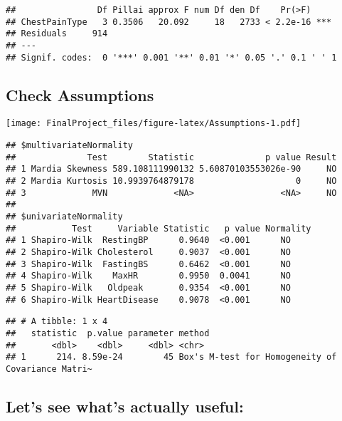 \documentclass[
]{article}
\newenvironment{Shaded}{\begin{snugshade}}{\end{snugshade}}
\newcommand{\AttributeTok}[1]{\textcolor[rgb]{0.77,0.63,0.00}{#1}}
\newcommand{\FunctionTok}[1]{\textcolor[rgb]{0.00,0.00,0.00}{#1}}
\newcommand{\NormalTok}[1]{#1}
\newcommand{\SpecialCharTok}[1]{\textcolor[rgb]{0.00,0.00,0.00}{#1}}
\begin{document}
\begin{verbatim}
##                Df Pillai approx F num Df den Df    Pr(>F)    
## ChestPainType   3 0.3506   20.092     18   2733 < 2.2e-16 ***
## Residuals     914                                            
## ---
## Signif. codes:  0 '***' 0.001 '**' 0.01 '*' 0.05 '.' 0.1 ' ' 1
\end{verbatim}

\hypertarget{check-assumptions}{%
\subsection{Check Assumptions}\label{check-assumptions}}

\texttt{[image: FinalProject\_files/figure-latex/Assumptions-1.pdf]}

\begin{verbatim}
## $multivariateNormality
##              Test        Statistic              p value Result
## 1 Mardia Skewness 589.108111990132 5.60870103553026e-90     NO
## 2 Mardia Kurtosis 10.9939764879178                    0     NO
## 3             MVN             <NA>                 <NA>     NO
## 
## $univariateNormality
##           Test     Variable Statistic   p value Normality
## 1 Shapiro-Wilk  RestingBP      0.9640  <0.001      NO    
## 2 Shapiro-Wilk Cholesterol     0.9037  <0.001      NO    
## 3 Shapiro-Wilk  FastingBS      0.6462  <0.001      NO    
## 4 Shapiro-Wilk    MaxHR        0.9950  0.0041      NO    
## 5 Shapiro-Wilk   Oldpeak       0.9354  <0.001      NO    
## 6 Shapiro-Wilk HeartDisease    0.9078  <0.001      NO
\end{verbatim}

\begin{verbatim}
## # A tibble: 1 x 4
##   statistic  p.value parameter method                                           
##       <dbl>    <dbl>     <dbl> <chr>                                            
## 1      214. 8.59e-24        45 Box's M-test for Homogeneity of Covariance Matri~
\end{verbatim}

\hypertarget{lets-see-whats-actually-useful}{%
\subsection{Let's see what's actually
useful:}\label{lets-see-whats-actually-useful}}

\begin{Shaded}
\end{Shaded}
\end{document}
